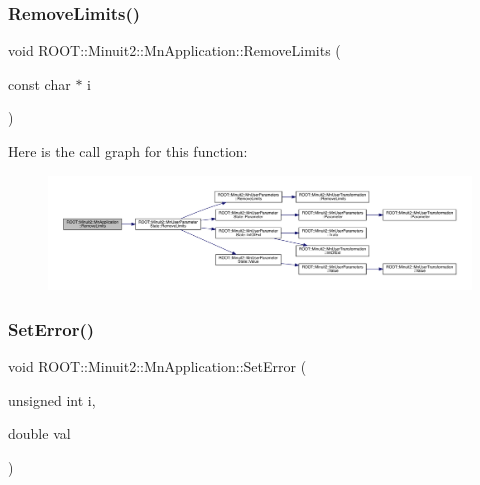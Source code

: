\mbox{\label{classROOT_1_1Minuit2_1_1MnApplication_ae33804b5db979701f0f86b88b4124dd0}} 
\subsubsection{\texorpdfstring{RemoveLimits()}{RemoveLimits()}\hspace{0.1cm}{\footnotesize\ttfamily [6/6]}}
{\footnotesize\ttfamily void R\+O\+O\+T\+::\+Minuit2\+::\+Mn\+Application\+::\+Remove\+Limits (\begin{DoxyParamCaption}\item[{const char $\ast$}]{i }\end{DoxyParamCaption})}

Here is the call graph for this function\+:
\nopagebreak
\begin{figure}[H]
\begin{center}
\leavevmode
\includegraphics[width=350pt]{df/dd5/classROOT_1_1Minuit2_1_1MnApplication_ae33804b5db979701f0f86b88b4124dd0_cgraph}
\end{center}
\end{figure}
\mbox{\label{classROOT_1_1Minuit2_1_1MnApplication_a04e02c59439b7c638cea29938030b2f8}} 
\subsubsection{\texorpdfstring{SetError()}{SetError()}\hspace{0.1cm}{\footnotesize\ttfamily [1/6]}}
{\footnotesize\ttfamily void R\+O\+O\+T\+::\+Minuit2\+::\+Mn\+Application\+::\+Set\+Error (\begin{DoxyParamCaption}\item[{unsigned int}]{i,  }\item[{double}]{val }\end{DoxyParamCaption})}

